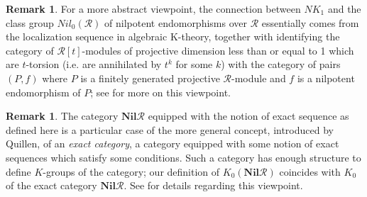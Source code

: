 \documentclass{amsart}
\theoremstyle{definition}
\newtheorem{rem}[equation]{Remark}
\theoremstyle{definition}
\newcommand{\calR}{\mathcal{R}}
\numberwithin{equation}{subsection}
\begin{document}
\begin{rem}\label{rem:nilviewlocalization}
For a more abstract viewpoint, the connection between $NK_{1}$ and the class group $Nil_{0}(\calR)$ of nilpotent endomorphisms over $\calR$ essentially comes from the localization sequence in algebraic K-theory, together with identifying the category of $\calR[t]$-modules of projective dimension less than or equal to 1 which are $t$-torsion (i.e. are annihilated by $t^{k}$ for some $k$) with the category of pairs $(P,f)$ where $P$ is a finitely generated projective $\calR$-module and $f$ is a nilpotent endomorphism of $P$; see \cite[Chapter III]{WeibelBook} for more on this viewpoint.
\end{rem}


\begin{rem}\label{rem:exactcategory}
The category $\textbf{Nil}\calR$ equipped with the notion of exact sequence as defined here is a particular case of the more general concept, introduced by Quillen, of an {\it exact category}, a category equipped with some notion of exact sequences which satisfy some conditions. Such a category has enough structure to define $K$-groups of the category; our definition of $K_{0}(\textbf{Nil}\calR)$ coincides with $K_{0}$ of the exact category $\textbf{Nil}\calR$. See \cite[II Sec. 7]{WeibelBook} for details regarding this viewpoint.
\end{rem}
\end{document}
